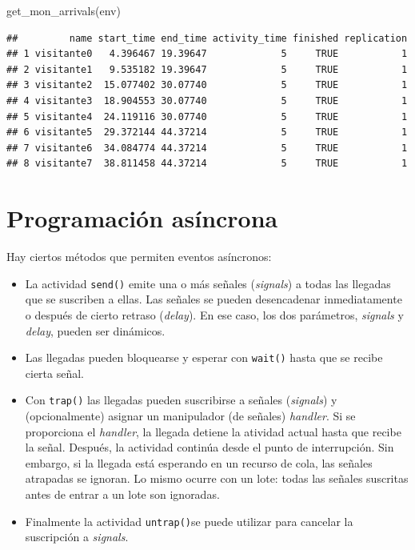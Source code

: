 \documentclass[
]{book}
\newenvironment{Shaded}{\begin{snugshade}}{\end{snugshade}}
\newcommand{\FunctionTok}[1]{\textcolor[rgb]{0.00,0.00,0.00}{#1}}
\newcommand{\NormalTok}[1]{#1}
\theoremstyle{definition}
\theoremstyle{definition}
\theoremstyle{definition}
\theoremstyle{definition}
\theoremstyle{remark}
\begin{document}
\begin{Shaded}
\begin{Highlighting}[]
\FunctionTok{get\_mon\_arrivals}\NormalTok{(env)}
\end{Highlighting}
\end{Shaded}

\begin{verbatim}
##         name start_time end_time activity_time finished replication
## 1 visitante0   4.396467 19.39647             5     TRUE           1
## 2 visitante1   9.535182 19.39647             5     TRUE           1
## 3 visitante2  15.077402 30.07740             5     TRUE           1
## 4 visitante3  18.904553 30.07740             5     TRUE           1
## 5 visitante4  24.119116 30.07740             5     TRUE           1
## 6 visitante5  29.372144 44.37214             5     TRUE           1
## 7 visitante6  34.084774 44.37214             5     TRUE           1
## 8 visitante7  38.811458 44.37214             5     TRUE           1
\end{verbatim}

\hypertarget{programaciuxf3n-asuxedncrona}{%
\section{Programación asíncrona}\label{programaciuxf3n-asuxedncrona}}

Hay ciertos métodos que permiten eventos asíncronos:

\begin{itemize}
\item
  La actividad \texttt{send()} emite una o más señales (\emph{signals}) a todas las llegadas que se suscriben a ellas. Las señales se pueden desencadenar inmediatamente o después de cierto retraso (\emph{delay}). En ese caso, los dos parámetros, \emph{signals} y \emph{delay}, pueden ser dinámicos.
\item
  Las llegadas pueden bloquearse y esperar con \texttt{wait()} hasta que se recibe cierta señal.
\item
  Con \texttt{trap()} las llegadas pueden suscribirse a señales (\emph{signals}) y (opcionalmente) asignar un manipulador (de señales) \emph{handler}. Si se proporciona el \emph{handler}, la llegada detiene la atividad actual hasta que recibe la señal. Después, la actividad continúa desde el punto de interrupción. Sin embargo, si la llegada está esperando en un recurso de cola, las señales atrapadas se ignoran. Lo mismo ocurre con un lote: todas las señales suscritas antes de entrar a un lote son ignoradas.
\item
  Finalmente la actividad \texttt{untrap()}se puede utilizar para cancelar la suscripción a \emph{signals}.
\end{itemize}
\end{document}
